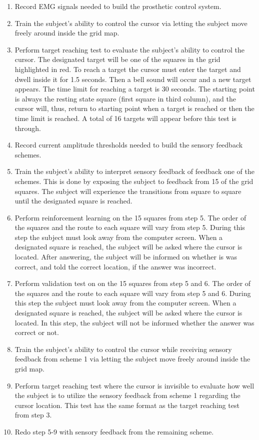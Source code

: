 \begin{enumerate}
	\item Record EMG signals needed to build the prosthetic control system.
	\item Train the subject's ability to control the cursor via letting the subject move freely around inside the grid map.
	\item Perform target reaching test to evaluate the subject's ability to control the cursor. The designated target will be one of the squares in the grid highlighted in red. To reach a target the cursor must enter the target and dwell inside it for 1.5 seconds. Then a bell sound will occur and a new target appears. The time limit for reaching a target is 30 seconds. The starting point is always the resting state square (first square in third column), and the cursor will, thus, return to starting point when a target is reached or then the time limit is reached. A total of 16 targets will appear before this test is through.
	\item Record current amplitude thresholds needed to build the sensory feedback schemes.
	\item Train the subject's ability to interpret sensory feedback of feedback one of the schemes. This is done  by exposing the subject to feedback from 15 of the grid squares. The subject will experience the transitions from square to square until the designated square is reached.  
	\item Perform reinforcement learning on the 15 squares from step 5. The order of the squares and the route to each square will vary from step 5. During this step the subject must look away from the computer screen. When a designated square is reached, the subject will be asked where the cursor is located. After answering, the subject will be informed on whether is was correct, and told the correct location, if the answer was incorrect. 
	\item Perform validation test on on the 15 squares from step 5 and 6. The order of the squares and the route to each square will vary from step 5 and 6. During this step the subject must look away from the computer screen. When a designated square is reached, the subject will be asked where the cursor is located. In this step, the subject will not be informed whether the answer was correct or not.
	\item Train the subject's ability to control the cursor while receiving sensory feedback from scheme 1 via letting the subject move freely around inside the grid map.
	\item Perform target reaching test where the cursor is invisible to evaluate how well the subject is to utilize the sensory feedback from scheme 1 regarding the cursor location. This test has the same format as the target reaching test from step 3.
	\item Redo step 5-9 with sensory feedback from the remaining scheme.
\end{enumerate}


